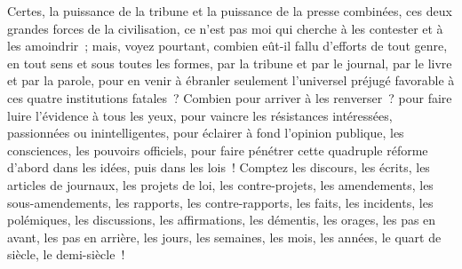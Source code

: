 \documentclass[french,twoside]{book} %
\begin{document}
Certes, la puissance de la tribune et la puissance de la presse combinées, ces deux grandes forces de la civilisation, ce n’est pas moi qui cherche à les contester et à les amoindrir ; mais, voyez pourtant, combien eût-il fallu d’efforts de tout genre, en tout sens et sous toutes les formes, par la tribune et par le journal, par le livre et par la parole, pour en venir à ébranler seulement l’universel préjugé favorable à ces quatre institutions fatales ? Combien pour arriver à les renverser ? pour faire luire l’évidence à tous les yeux, pour vaincre les résistances intéressées, passionnées ou inintelligentes, pour éclairer à fond l’opinion publique, les consciences, les pouvoirs officiels, pour faire pénétrer cette quadruple réforme d’abord dans les idées, puis dans les lois ! Comptez les discours, les écrits, les articles de journaux, les projets de loi, les contre-projets, les amendements, les sous-amendements, les rapports, les contre-rapports, les faits, les incidents, les polémiques, les discussions, les affirmations, les démentis, les orages, les pas en avant, les pas en arrière, les jours, les semaines, les mois, les années, le quart de siècle, le demi-siècle !
\end{document}
